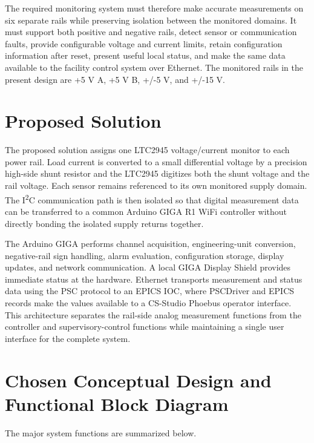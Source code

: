 The required monitoring system must therefore make accurate measurements on
six separate rails while preserving isolation between the monitored domains. It
must support both positive and negative rails, detect sensor or communication
faults, provide configurable voltage and current limits, retain configuration
information after reset, present useful local status, and make the same data
available to the facility control system over Ethernet. The monitored rails in
the present design are +5 V A, +5 V B, +/-5 V, and +/-15 V.

\section{Proposed Solution}
The proposed solution assigns one LTC2945 voltage/current monitor to each power
rail. Load current is converted to a small differential voltage by a precision
high-side shunt resistor and the LTC2945 digitizes both the shunt voltage and the
rail voltage. Each sensor remains referenced to its own monitored supply domain.
The I\textsuperscript{2}C communication path is then isolated so that digital
measurement data can be transferred to a common Arduino GIGA R1 WiFi controller
without directly bonding the isolated supply returns together.

The Arduino GIGA performs channel acquisition, engineering-unit conversion,
negative-rail sign handling, alarm evaluation, configuration storage, display
updates, and network communication. A local GIGA Display Shield provides
immediate status at the hardware. Ethernet transports measurement and status
data using the PSC protocol to an EPICS IOC, where PSCDriver and EPICS records
make the values available to a CS-Studio Phoebus operator interface. This
architecture separates the rail-side analog measurement functions from the
controller and supervisory-control functions while maintaining a single user
interface for the complete system.

\section{Chosen Conceptual Design and Functional Block Diagram}
\label{sec:functional-blocks}
The major system functions are summarized below.

